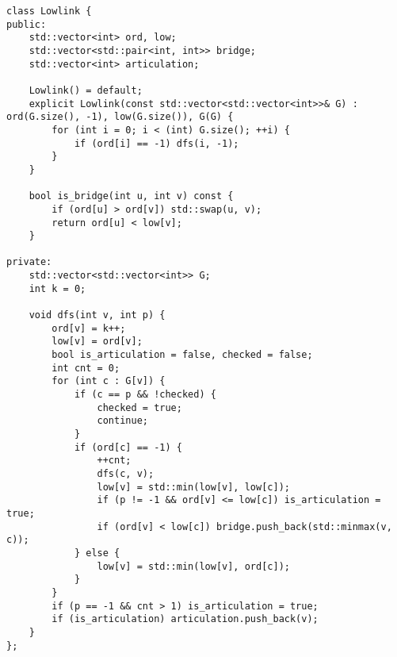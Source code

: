 \begin{lstlisting}
class Lowlink {
public:
    std::vector<int> ord, low;
    std::vector<std::pair<int, int>> bridge;
    std::vector<int> articulation;

    Lowlink() = default;
    explicit Lowlink(const std::vector<std::vector<int>>& G) : ord(G.size(), -1), low(G.size()), G(G) {
        for (int i = 0; i < (int) G.size(); ++i) {
            if (ord[i] == -1) dfs(i, -1);
        }
    }

    bool is_bridge(int u, int v) const {
        if (ord[u] > ord[v]) std::swap(u, v);
        return ord[u] < low[v];
    }

private:
    std::vector<std::vector<int>> G;
    int k = 0;

    void dfs(int v, int p) {
        ord[v] = k++;
        low[v] = ord[v];
        bool is_articulation = false, checked = false;
        int cnt = 0;
        for (int c : G[v]) {
            if (c == p && !checked) {
                checked = true;
                continue;
            }
            if (ord[c] == -1) {
                ++cnt;
                dfs(c, v);
                low[v] = std::min(low[v], low[c]);
                if (p != -1 && ord[v] <= low[c]) is_articulation = true;
                if (ord[v] < low[c]) bridge.push_back(std::minmax(v, c));
            } else {
                low[v] = std::min(low[v], ord[c]);
            }
        }
        if (p == -1 && cnt > 1) is_articulation = true;
        if (is_articulation) articulation.push_back(v);
    }
};
\end{lstlisting}